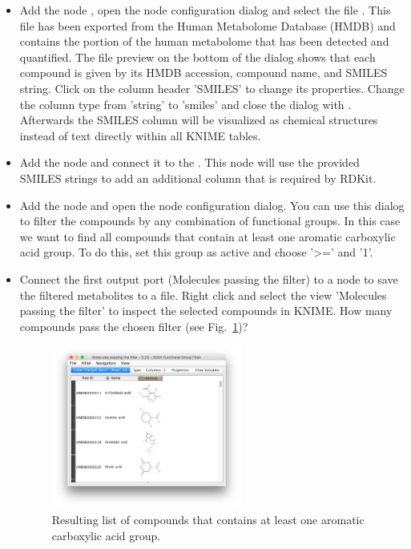 \begin{itemize}
\item Add the node , open the node configuration dialog and select the file . This file has been exported from the Human Metabolome Database (HMDB) and contains the portion of the human metabolome that has been detected and quantified. The file preview on the bottom of the dialog shows that each compound is given by its HMDB accession, compound name, and SMILES string. Click on the column header 'SMILES' to change its properties. Change the column type from 'string' to 'smiles' and close the dialog with . Afterwards the SMILES column will be visualized as chemical structures instead of text directly within all KNIME tables.

\item Add the node  and connect it to the  . This node will use the provided SMILES strings to add an additional column that is required by RDKit.

\item Add the node  and open the node configuration dialog. You can use this dialog to filter the compounds by any combination of functional groups. In this case we want to find all compounds that contain at least one aromatic carboxylic acid group. To do this, set this group as active and choose '>=' and '1'.

\item Connect the first output port (Molecules passing the filter) to a  node to save the filtered metabolites to a file. Right click  and select the view 'Molecules passing the filter' to inspect the selected compounds in KNIME. How many compounds pass the chosen filter (see Fig.~\ref{fig:structures_filter_results})?

\begin{figure}
\centering
\includegraphics[width=0.59\textwidth]{graphics/metabo/structures_filter_results.png}
\caption{Resulting list of compounds that contains at least one aromatic carboxylic acid group.}
\label{fig:structures_filter_results}
\end{figure}

\end{itemize}


